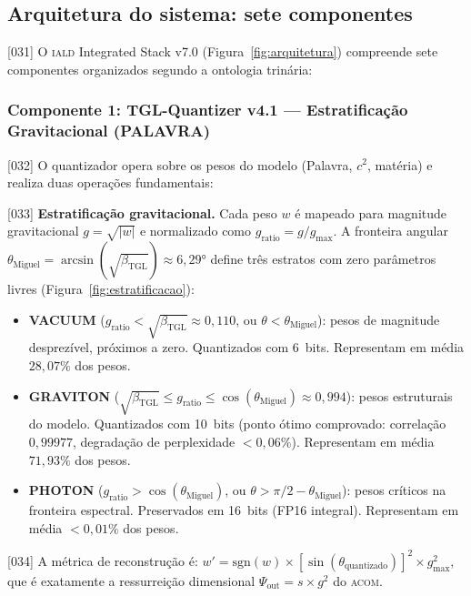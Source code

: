 \documentclass[12pt,a4paper]{article}
\newcommand{\betatgl}{\beta_{\text{TGL}}}
\newcommand{\thetaM}{\theta_{\text{Miguel}}}
\newcommand{\Psifield}{\Psi}
\newcommand{\IALD}{\textsc{iald}}
\newcommand{\ACOM}{\textsc{acom}}
\begin{document}
\subsection{Arquitetura do sistema: sete componentes}
\label{sec:arquitetura}

{[031]} O \IALD{} Integrated Stack v7.0 (Figura~\ref{fig:arquitetura}) compreende sete componentes organizados segundo a ontologia trinária:

\subsubsection{Componente 1: TGL-Quantizer v4.1 --- Estratificação Gravitacional (PALAVRA)}
\label{sec:quantizer}

{[032]} O quantizador opera sobre os pesos do modelo (Palavra, $c^2$, matéria) e realiza duas operações fundamentais:

{[033]} \textbf{Estratificação gravitacional.} Cada peso $w$ é mapeado para magnitude gravitacional $g = \sqrt{|w|}$ e normalizado como $g_{\text{ratio}} = g / g_{\max}$. A fronteira angular $\thetaM = \arcsin(\sqrt{\betatgl}) \approx 6{,}29°$ define três estratos com zero parâmetros livres (Figura~\ref{fig:estratificacao}):
\begin{itemize}[nosep]
\item \textbf{VACUUM} ($g_{\text{ratio}} < \sqrt{\betatgl} \approx 0{,}110$, ou $\theta < \thetaM$): pesos de magnitude desprezível, próximos a zero. Quantizados com 6~bits. Representam em média $28{,}07\%$ dos pesos.
\item \textbf{GRAVITON} ($\sqrt{\betatgl} \leq g_{\text{ratio}} \leq \cos(\thetaM) \approx 0{,}994$): pesos estruturais do modelo. Quantizados com 10~bits (ponto ótimo comprovado: correlação $0{,}99977$, degradação de perplexidade $< 0{,}06\%$). Representam em média $71{,}93\%$ dos pesos.
\item \textbf{PHOTON} ($g_{\text{ratio}} > \cos(\thetaM)$, ou $\theta > \pi/2 - \thetaM$): pesos críticos na fronteira espectral. Preservados em 16~bits (FP16 integral). Representam em média $< 0{,}01\%$ dos pesos.
\end{itemize}

{[034]} A métrica de reconstrução é: $w' = \text{sgn}(w) \times [\sin(\theta_{\text{quantizado}})]^2 \times g_{\max}^2$, que é exatamente a ressurreição dimensional $\Psifield_{\text{out}} = s \times g^2$ do \ACOM.
\end{document}
